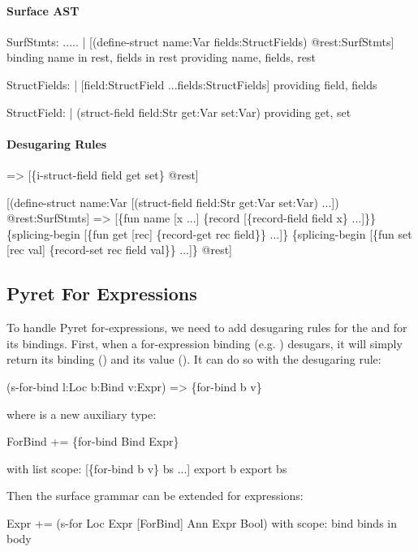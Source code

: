 \paragraph{Surface AST}
\begin{Codes}
SurfStmts:
  .....
| [(define-struct name:Var fields:StructFields) @rest:SurfStmts]
  binding name in rest, fields in rest
  providing name, fields, rest

StructFields:
| [field:StructField ...fields:StructFields]
  providing field, fields

StructField:
| (struct-field field:Str get:Var set:Var)
  providing get, set
\end{Codes}

\paragraph{Desugaring Rules}
\begin{Codes}
=> [\{i-struct-field field get set\} @rest]
  
   [(define-struct name:Var
      [(struct-field field:Str get:Var set:Var) ...]) @rest:SurfStmts]
=> [\{fun name [x ...] \{record [\{record-field field x\} ...]\}\}
    \{splicing-begin [\{fun get [rec] \{record-get rec field\}\} ...]\}
    \{splicing-begin [\{fun set [rec val] \{record-set rec field val\}\} ...]\}
    @rest]
\end{Codes}

\subsection{Pyret For Expressions}

To handle Pyret for-expressions, we need to add desugaring rules for
the  and for its bindings. 
First, when a for-expression binding (e.g. ) desugars,
it will simply return its binding () and its value ().
It can do so with the desugaring rule:
\begin{Codes}
   (s-for-bind l:Loc b:Bind v:Expr)
=> \{for-bind b v\}
\end{Codes}
where  is a new auxiliary type:
\begin{Codes}
ForBind += \{for-bind Bind Expr\}

with list scope:
  [\{for-bind b v\} bs ...]
  export b
  export bs
\end{Codes}

Then the surface grammar can be extended for  expressions:
\begin{Codes}
Expr += (s-for Loc Expr [ForBind] Ann Expr Bool)
with scope:
  bind binds in body
\end{Codes}

